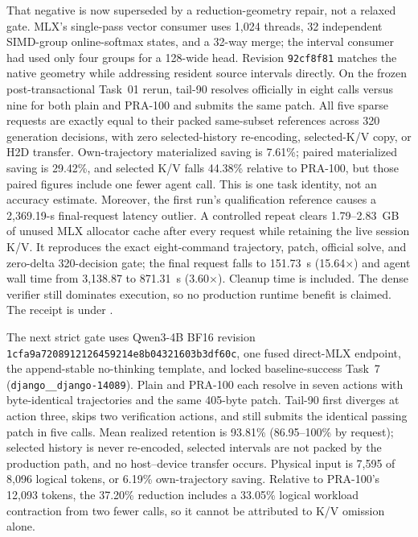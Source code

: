 \documentclass[11pt]{article}
\begin{document}
That negative is now superseded by a reduction-geometry repair, not a relaxed
gate.  MLX's single-pass vector consumer uses 1,024 threads, 32 independent
SIMD-group online-softmax states, and a 32-way merge; the interval consumer had
used only four groups for a 128-wide head.  Revision \texttt{92cf8f81} matches
the native geometry while addressing resident source intervals directly.  On
the frozen post-transactional Task~01 rerun, tail-90 resolves officially in
eight calls versus nine for both plain and PRA-100 and submits the same patch.
All five sparse requests are exactly equal to their packed same-subset
references across 320 generation decisions, with zero selected-history
re-encoding, selected-K/V copy, or H2D transfer.  Own-trajectory materialized
saving is 7.61\%; paired materialized saving is 29.42\%, and selected K/V falls
44.38\% relative to PRA-100, but those paired figures include one fewer agent
call.  This is one task identity, not an accuracy estimate.  Moreover, the
first run's qualification reference causes a 2,369.19-s final-request latency
outlier.  A controlled repeat clears 1.79--2.83~GB of unused MLX allocator
cache after every request while retaining the live session K/V.  It reproduces
the exact eight-command trajectory, patch, official solve, and zero-delta
320-decision gate; the final request falls to 151.73~s (15.64$\times$) and
agent wall time from 3,138.87 to 871.31~s (3.60$\times$).  Cleanup time is
included.  The dense verifier still dominates execution, so no production
runtime benefit is claimed.  The receipt is under
.

The next strict gate uses Qwen3-4B BF16 revision
\texttt{1cfa9a7208912126459214e8b04321603b3df60c}, one fused direct-MLX
endpoint, the append-stable no-thinking template, and locked baseline-success
Task~7 (\texttt{django\_\_django-14089}).  Plain and PRA-100 each resolve in
seven actions with byte-identical trajectories and the same 405-byte patch.
Tail-90 first diverges at action three, skips two verification actions, and
still submits the identical passing patch in five calls.  Mean realized
retention is 93.81\% (86.95--100\% by request); selected history is never
re-encoded, selected intervals are not packed by the production path, and no
host--device transfer occurs.  Physical input is 7,595 of 8,096 logical tokens,
or 6.19\% own-trajectory saving.  Relative to PRA-100's 12,093 tokens, the
37.20\% reduction includes a 33.05\% logical workload contraction from two
fewer calls, so it cannot be attributed to K/V omission alone.
\end{document}
